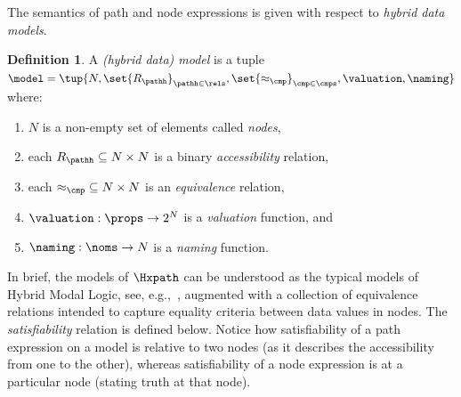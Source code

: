 \documentclass[10pt,a4paper]{amsart}
\theoremstyle{definition}
\newtheorem{defi}[thm]{Definition}
\theoremstyle{remark}
\begin{document}

The semantics of path and node expressions is given with respect to \emph{hybrid data models}.

\begin{defi}\label{def:models}
  A \emph{(hybrid data) model} is a tuple $\model = \tup{N, \set{R_\pathh}_{\pathh \in \rels}, \set{\approx_{\cmp}}_{\cmp\in\cmps}, \valuation, \naming}$ where:
  \begin{enumerate} 
    \item $N$ is a non-empty set of elements called \emph{nodes}, 
    \item each $R_{\pathh}\subseteq {N\times N}$ is a binary \emph{accessibility} relation,
    \item each ${\approx_{\cmp}} \subseteq {N\times N}$ is an \emph{equivalence} relation, 
    \item $\valuation :\props \to 2^N$  is a \emph{valuation} function, and 
    \item $\naming : \noms \to N$ is a \emph{naming} function.
  \end{enumerate}
\end{defi}

In brief, the models of $\Hxpath$ can be understood as the typical models of Hybrid Modal Logic, see, e.g.,~\cite{arec:hybr05b}, augmented with a collection of equivalence relations intended to capture equality criteria between data values in nodes.
The \emph{satisfiability} relation is defined below. Notice how satisfiability of a path expression on a model is relative to two nodes (as it describes the accessibility from one to the other), whereas satisfiability of a node expression is at a particular node (stating truth at that node). 
\end{document}
